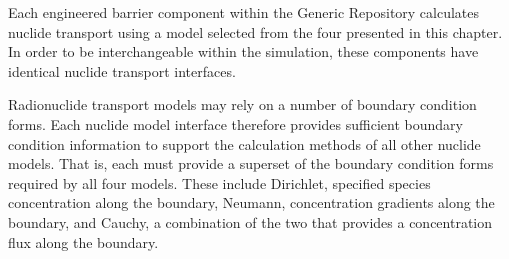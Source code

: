 Each engineered barrier component within the Generic Repository calculates 
nuclide transport using a model selected from the four presented in this 
chapter. In order to be interchangeable within the simulation, these components 
have identical nuclide transport interfaces.  

Radionuclide transport models may rely on a number of boundary condition forms.  
Each nuclide model interface therefore provides sufficient boundary condition 
information to support the calculation methods of all other nuclide models. That 
is, each must provide a superset of the boundary condition forms required by all 
four models. These include Dirichlet, specified species concentration along the 
boundary, Neumann, concentration gradients along the boundary, and Cauchy, a 
combination of the two that provides a concentration flux along the boundary.
